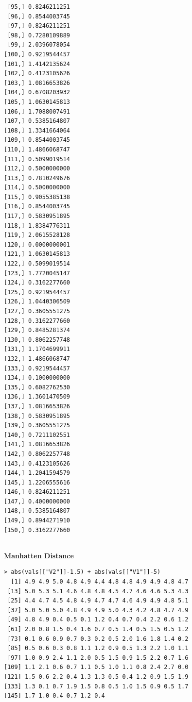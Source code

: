 \documentclass[fontsize=10pt]{scrartcl}
\begin{document}
\begin{enumerate}
\begin{enumerate}
\begin{verbatim}
 [95,] 0.8246211251
 [96,] 0.8544003745
 [97,] 0.8246211251
 [98,] 0.7280109889
 [99,] 2.0396078054
[100,] 0.9219544457
[101,] 1.4142135624
[102,] 0.4123105626
[103,] 1.0816653826
[104,] 0.6708203932
[105,] 1.0630145813
[106,] 1.7088007491
[107,] 0.5385164807
[108,] 1.3341664064
[109,] 0.8544003745
[110,] 1.4866068747
[111,] 0.5099019514
[112,] 0.5000000000
[113,] 0.7810249676
[114,] 0.5000000000
[115,] 0.9055385138
[116,] 0.8544003745
[117,] 0.5830951895
[118,] 1.8384776311
[119,] 2.0615528128
[120,] 0.0000000001
[121,] 1.0630145813
[122,] 0.5099019514
[123,] 1.7720045147
[124,] 0.3162277660
[125,] 0.9219544457
[126,] 1.0440306509
[127,] 0.3605551275
[128,] 0.3162277660
[129,] 0.8485281374
[130,] 0.8062257748
[131,] 1.1704699911
[132,] 1.4866068747
[133,] 0.9219544457
[134,] 0.1000000000
[135,] 0.6082762530
[136,] 1.3601470509
[137,] 1.0816653826
[138,] 0.5830951895
[139,] 0.3605551275
[140,] 0.7211102551
[141,] 1.0816653826
[142,] 0.8062257748
[143,] 0.4123105626
[144,] 1.2041594579
[145,] 1.2206555616
[146,] 0.8246211251
[147,] 0.4000000000
[148,] 0.5385164807
[149,] 0.8944271910
[150,] 0.3162277660


\end{verbatim}

				\textbf{\large Manhatten Distance} \\

\begin{verbatim}
> abs(vals[["V2"]]-1.5) + abs(vals[["V1"]]-5)
  [1] 4.9 4.9 5.0 4.8 4.9 4.4 4.8 4.8 4.9 4.9 4.8 4.7
 [13] 5.0 5.3 5.1 4.6 4.8 4.8 4.5 4.7 4.6 4.6 5.3 4.3
 [25] 4.4 4.7 4.5 4.8 4.9 4.7 4.7 4.6 4.9 4.9 4.8 5.1
 [37] 5.0 5.0 5.0 4.8 4.9 4.9 5.0 4.3 4.2 4.8 4.7 4.9
 [49] 4.8 4.9 0.4 0.5 0.1 1.2 0.4 0.7 0.4 2.2 0.6 1.2
 [61] 2.0 0.8 1.5 0.4 1.6 0.7 0.5 1.4 0.5 1.5 0.5 1.2
 [73] 0.1 0.6 0.9 0.7 0.3 0.2 0.5 2.0 1.6 1.8 1.4 0.2
 [85] 0.5 0.6 0.3 0.8 1.1 1.2 0.9 0.5 1.3 2.2 1.0 1.1
 [97] 1.0 0.9 2.4 1.1 2.0 0.5 1.5 0.9 1.5 2.2 0.7 1.6
[109] 1.1 2.1 0.6 0.7 1.1 0.5 1.0 1.1 0.8 2.4 2.7 0.0
[121] 1.5 0.6 2.2 0.4 1.3 1.3 0.5 0.4 1.2 0.9 1.5 1.9
[133] 1.3 0.1 0.7 1.9 1.5 0.8 0.5 1.0 1.5 0.9 0.5 1.7
[145] 1.7 1.0 0.4 0.7 1.2 0.4


\end{verbatim}


\end{enumerate}
\end{enumerate}
\end{document}
